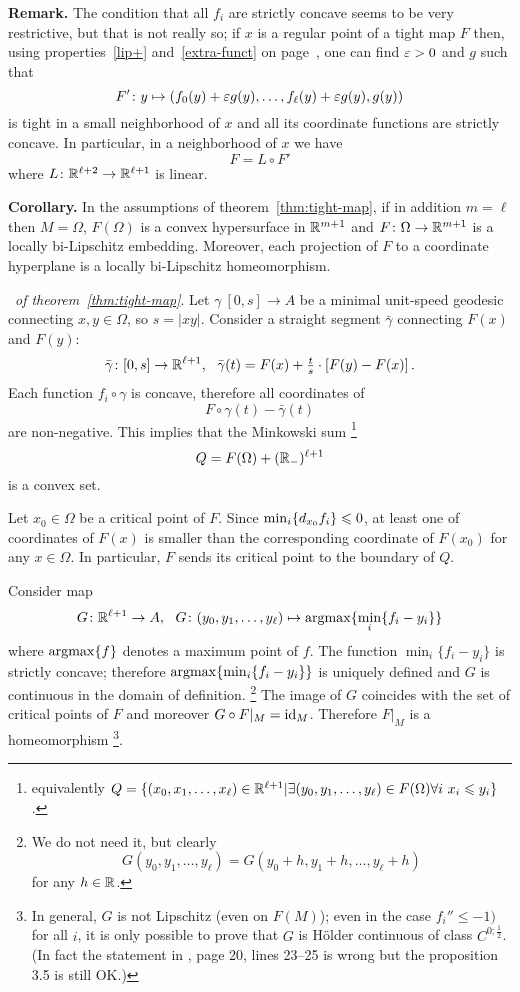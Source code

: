 \documentclass{article}
\begin{document}
\begin{thm}{\bf Remark.} 
{\rm The condition that all $f_i$ are strictly concave
seems to be very restrictive, but that is not really so; if $x$ is a regular
point of a tight map $F$ then, using properties~\ref{lip+} and~\ref{extra-funct}
on page~\pageref{lip+}, one can find $\varepsilon>0$ and $g$ such that 
$$F'\colon y
\mapsto
(f_0(y)+\varepsilon g(y),\dots,f_\ell(y)+\varepsilon g(y),g(y))$$ 
is tight in a small neighborhood of $x$ and all its coordinate functions are
strictly concave. 
In particular, in a neighborhood of $x$ we have 
$$F=L\circ F'$$
where $L\colon\mathbb{R}^{\ell+2}\to \mathbb{R}^{\ell+1}$ is linear.}
\end{thm}


\begin{thm}{\bf Corollary.}\label{cor:conv-chart}
In the assumptions of theorem~\ref{thm:tight-map}, if in addition $m=\ell$ then
$M=\Omega$, $F(\Omega)$ is a convex hypersurface in $\mathbb{R}^{m+1}$ and $F\colon\Omega\to
\mathbb{R}^{m+1}$ is a locally bi-Lipschitz embedding. 
Moreover, each projection of $F$ to a coordinate hyperplane is a locally
bi-Lipschitz homeomorphism.
\end{thm}

\Proof\ {\it of theorem~\ref{thm:tight-map}}. 
Let $\gamma\:[0,s]\to A$ be a minimal unit-speed geodesic connecting $x,y\in \Omega$, so $s=|x y|$.
Consider a straight segment $\bar\gamma$ connecting $F(x)$ and $F(y)$: 
$$\bar\gamma\colon[0,s]\to\mathbb{R}^{\ell+1},
\ \  
\bar\gamma(t)=F(x)+\tfrac
t s\cdot\left[F(y)-F(x)\right].$$
Each function $f_i\circ\gamma$ is concave, therefore all coordinates of 
$$F\circ\gamma(t)-\bar\gamma(t)$$ 
are non-negative.
This implies that the Minkowski sum%
\footnote{equivalently 
$Q=\{(x_0,x_1,\dots,x_\ell)\in\mathbb{R}^{\ell+1}|\exists(y_0,y_1,\dots,y_\ell)\in
F(\Omega)\forall i\  x_i\leqslant y_i\}$.} 
$$Q=F(\Omega)+(\mathbb{R}_-)^{\ell+1}$$ 
is a convex set.

Let $x_0\in \Omega$ be a critical point of $F$. 
Since $\min_i\{d_{x_0}f_i\}\leqslant 0$, at least one of coordinates
of $F(x)$ is smaller than the corresponding coordinate of $F(x_0)$ for any $x\in\Omega$.
In particular, $F$ sends its critical point to the boundary of $Q$.

Consider map 
$$G\:\RR^{\ell+1}\to A,
\ \ 
G\:(y_0,y_1,\dots,y_\ell)
\mapsto
\argmax\{\min_i\{f_i-y_i\}\}$$
where \label{argmax}$\operatorname{argmax}\{f\}$ denotes a maximum point of $f$.
The function $\min_i\{f_i-y_i\}$ is strictly concave; 
therefore
$\operatorname{argmax}\{\min_i\{f_i-y_i\}\}$ is uniquely defined and $G$ is continuous in the
domain of definition.%
\footnote{We do not need it, but clearly
$$G(y_0,y_1,\dots,y_\ell)
=
G(y_0+h,y_1+h,\dots,y_\ell+h)$$ 
for any $h\in \mathbb{R}$.} 
The image of $G$ coincides with the set of critical points of $F$ and moreover $G\circ
F|_M=\operatorname{id}_M$. 
Therefore $F|_M$ is a homeomorphism%
\footnote{In general, $G$ is not Lipschitz
(even on $F(M)$); 
even in the case  $f_i''\le-1)$ for all $i$, 
it is only
possible to prove that $G$ is H\"older continuous of class $C^{0;\frac12}$. (In
fact the statement in \cite{perelman:spaces2}, page 20, lines 23--25 is wrong
but the proposition 3.5 is still OK.)}.
\qeds
\end{document}
